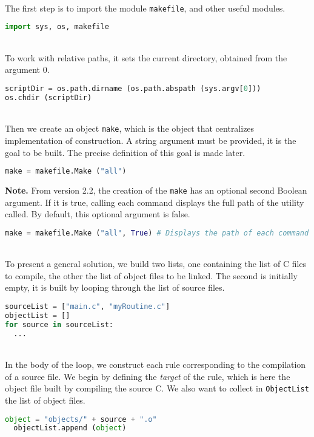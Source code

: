 \documentclass[a4paper,11pt]{extarticle}
\begin{document}
~\\The first step is to import the module \texttt{makefile}, and other useful modules.
\begin{lstlisting}[language=py]
import sys, os, makefile
\end{lstlisting}

~\\To work with relative paths, it sets the current directory, obtained from the argument $0$.
\begin{lstlisting}[language=py]
scriptDir = os.path.dirname (os.path.abspath (sys.argv[0]))
os.chdir (scriptDir)
\end{lstlisting}

~\\Then we create an object \texttt{make}, which is the object that centralizes implementation of construction. A string argument must be provided, it is the goal to be built. The precise definition of this goal is made later.
\begin{lstlisting}[language=py]
make = makefile.Make ("all")
\end{lstlisting}

{\bf Note.}\label{logUtilityToolPath} From version 2.2, the creation of the \texttt{make} has an optional second Boolean argument. If it is true, calling each command displays the full path of the utility called. By default, this optional argument is false.
\begin{lstlisting}[language=py]
make = makefile.Make ("all", True) # Displays the path of each command called
\end{lstlisting}

~\\To present a general solution, we build two lists, one containing the list of C files to compile, the other the list of object files to be linked. The second is initially empty, it is built by looping through the list of source files. 
\begin{lstlisting}[language=py]
sourceList = ["main.c", "myRoutine.c"]
objectList = []
for source in sourceList:
  ...
\end{lstlisting}

~\\In the body of the loop, we construct each rule corresponding to the compilation of a source file. We begin by defining the \emph{target} of the rule, which is here the object file built by compiling the source C. We also want to collect in \texttt{ObjectList}  the list of object files.
\begin{lstlisting}[language=py]
  object = "objects/" + source + ".o"
  objectList.append (object)
\end{lstlisting}
\end{document}
